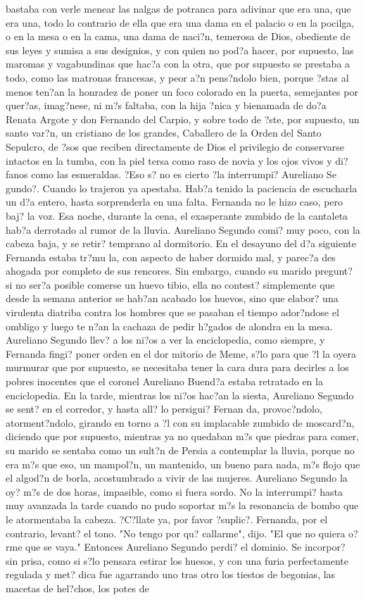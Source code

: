  bastaba con verle menear las nalgas de potranca para adivinar que era una, que era una, todo lo contrario de ella que era una dama en el palacio o en la pocilga, o en la mesa o en la cama, una dama de naci?n, temerosa de Dios, obediente de sus leyes y sumisa a sus designios, y con quien no pod?a hacer, por supuesto, las maromas y vagabundinas que hac?a con la otra, que por supuesto se prestaba a todo, como las matronas francesas, y peor a?n pens?ndolo bien, porque ?stas al menos ten?an la honradez de poner un foco colorado en la puerta, semejantes por quer?as, imag?nese, ni m?s faltaba, con la hija ?nica y bienamada de do?a Renata Argote y don Fernando del Carpio, y sobre todo de ?ste, por supuesto, un santo var?n, un cristiano de los grandes, Caballero de la Orden del Santo Sepulcro, de ?sos que reciben directamente de Dios el privilegio de conservarse intactos en la tumba, con la piel tersa como raso de novia y los ojos vivos y di?fanos como las esmeraldas. ?Eso s? no es cierto ?la interrumpi? Aureliano Se gundo?. Cuando lo trajeron ya apestaba. Hab?a tenido la paciencia de escucharla un d?a entero, hasta sorprenderla en una falta. Fernanda no le hizo caso, pero baj? la voz. Esa noche, durante la cena, el exasperante zumbido de la cantaleta hab?a derrotado al rumor de la lluvia. Aureliano Segundo comi? muy poco, con la cabeza baja, y se retir? temprano al dormitorio. En el desayuno del d?a siguiente Fernanda estaba tr?mu la, con aspecto de haber dormido mal, y parec?a des ahogada por completo de sus rencores. Sin embargo, cuando su marido pregunt? si no ser?a posible comerse un huevo tibio, ella no contest? simplemente que desde la semana anterior se hab?an acabado los huevos, sino que elabor? una virulenta diatriba contra los hombres que se pasaban el tiempo ador?ndose el ombligo y luego te n?an la cachaza de pedir h?gados de alondra en la mesa. Aureliano Segundo llev? a los ni?os a ver la enciclopedia, como siempre, y Fernanda fingi? poner orden en el dor mitorio de Meme, s?lo para que ?l la oyera murmurar que por supuesto, se necesitaba tener la cara dura para decirles a los pobres inocentes que el coronel Aureliano Buend?a estaba retratado en la enciclopedia. En la tarde, mientras los ni?os hac?an la siesta, Aureliano Segundo se sent? en el corredor, y hasta all? lo persigui? Fernan da, provoc?ndolo, atorment?ndolo, girando en torno a ?l con su implacable zumbido de moscard?n, diciendo que por supuesto, mientras ya no quedaban m?s que piedras para comer, su marido se sentaba como un sult?n de Persia a contemplar la lluvia, porque no era m?s que eso, un mampol?n, un mantenido, un bueno para nada, m?s flojo que el algod?n de borla, acostumbrado a vivir de las mujeres. Aureliano Segundo la oy? m?s de dos horas, impasible, como si fuera sordo. No la interrumpi? hasta muy avanzada la tarde cuando no pudo soportar m?s la resonancia de bombo que le atormentaba la cabeza. ?C?llate ya, por favor ?suplic?. Fernanda, por el contrario, levant? el tono. "No tengo por qu? callarme", dijo. "El que no quiera o?rme que se vaya." Entonces Aureliano Segundo perdi? el dominio. Se incorpor? sin prisa, como si s?lo pensara estirar los huesos, y con una furia perfectamente regulada y met? dica fue agarrando uno tras otro los tiestos de begonias, las macetas de hel?chos, los potes de 